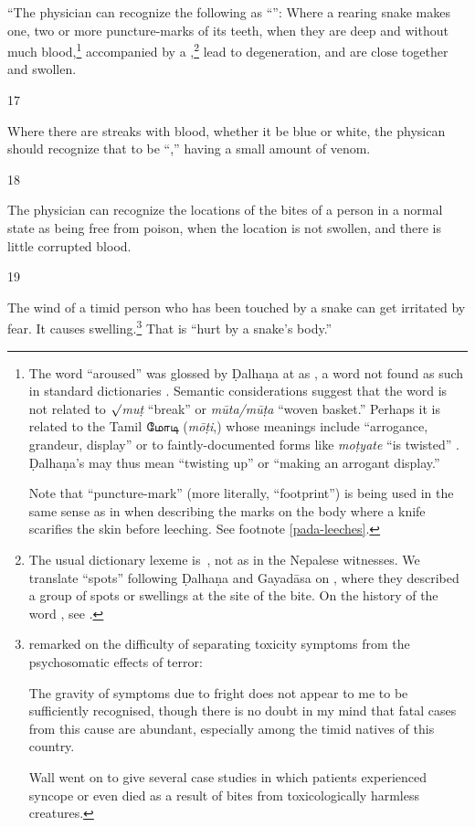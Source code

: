 \begin{translation}
“The physician can recognize the following as “”:
Where a rearing snake  makes one, two or more puncture-marks of its teeth,
when they are deep and without much blood,\footnote{\label{pada-snakes} The
    word  “aroused” was glossed by Ḍalhaṇa at  as
    , a word not found as such in standard dictionaries
    \citep{moni-sans,apte-prac,KEWA,josi-maha}. Semantic considerations
    suggest that the word is not related to $\surd$\emph{muṭ} “break” or
    \emph{mūta/mūṭa} “woven basket.” Perhaps it is related to the Tamil
    \texttamil{மோடி} (\emph{mōṭi},) whose meanings include “arrogance, grandeur,
    display” \citep[\#5133]{DED} or to faintly-documented forms like
    \emph{moṭyate} “is twisted” \citep[\#10186]{CDIAL}. Ḍalhaṇa's 
    may thus mean “twisting up” or “making an arrogant display.” \par Note that
     “puncture-mark” (more literally, “footprint”) is being used in
    the same sense as in  when describing the marks on the body
    where a knife scarifies the skin before leeching. See footnote
    \ref{pada-leeches}.} accompanied by a ,\footnote{The usual dictionary lexeme is \,, not 
        as in the Nepalese witnesses.  We translate “spots” following Ḍalhaṇa and
        Gayadāsa on , where they described a group of spots or
        swellings at the site of the bite. On the history of the word ,
        see \cite{kief-1996}.} lead to degeneration, and are close together and
        swollen.

\item [17]  

Where there are streaks with blood, whether it be blue or white, the
physican should recognize that to be “,” having a small
amount of venom.

\item[18]

The physician can recognize the locations of the bites of a person in a
normal state as being free from poison, when the location is not swollen,
and there is little corrupted blood.

\item [19]

The wind of a timid person who has been touched by a snake can get
irritated by fear.  It causes
swelling.\footnote{\label{fright}\citet[69]{wall-1913} remarked on the difficulty 
of separating
    toxicity symptoms from the psychosomatic effects of terror:\begin{quoting}
        The gravity of symptoms due to fright does not appear to me to be 
        sufficiently recognised, though there is no doubt in my mind that fatal cases 
        from this cause are abundant, especially among the timid natives of this 
        country.\end{quoting} Wall went on to give several case studies in which 
        patients experienced syncope or even died as a result of bites from 
        toxicologically harmless creatures.}  That is “hurt
    by a snake's body.”


\end{translation}
